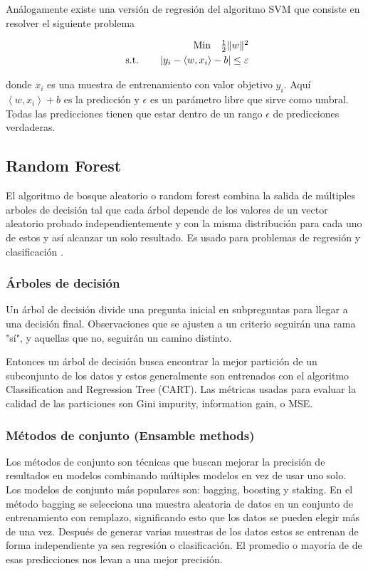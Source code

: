 Análogamente existe una versión de regresión del algoritmo SVM que consiste en resolver el siguiente problema

\[
\begin{array}{r@{}r@{}r@{}l}
	\text{Min} \quad \frac{1}{2}\|w\|^{2} \\[\jot]
	\text{s.t.}\qquad \left|y_{i}-\left\langle w, x_{i}\right\rangle-b\right| \leq \varepsilon \\
	
\end{array}
\]

donde $x_i$ es una muestra de entrenamiento con valor objetivo $y_i$. Aquí $\left\langle w, x_{i}\right\rangle+b$ es la predicción y $\epsilon$ es un parámetro libre que sirve como umbral. Todas las predicciones tienen que estar dentro de un rango $\epsilon$ de predicciones verdaderas. 

\subsection{Random Forest}
El algoritmo de bosque aleatorio o random forest combina la salida de múltiples arboles de decisión tal que cada árbol depende de los valores de un vector aleatorio probado independientemente y con la misma distribución para cada uno de estos y así alcanzar un solo resultado. Es usado para problemas de regresión y clasificación \cite{WhatRandomForest2021}.

\subsubsection{Árboles de decisión}
Un árbol de decisión divide una pregunta inicial en subpreguntas para llegar a una decisión final. Observaciones que se ajusten a un criterio seguirán una rama "sí", y aquellas que no, seguirán un camino distinto.

Entonces un árbol de decisión busca encontrar la mejor partición de un subconjunto de los datos y estos generalmente son entrenados con el algoritmo Classification and Regression Tree (CART).
Las métricas usadas para evaluar la calidad de las particiones son Gini impurity, information gain, o MSE.   

\subsubsection{Métodos de conjunto (Ensamble methods)}

Los métodos de conjunto son técnicas que buscan mejorar la precisión de resultados en modelos combinando múltiples modelos en vez de usar uno solo. Los modelos de conjunto más populares son: bagging, boosting y staking.
En el método bagging se selecciona una muestra aleatoria de datos en un conjunto de entrenamiento con remplazo, significando esto que los datos se pueden elegir más de una vez. Después de generar varias muestras de los datos estos se entrenan de forma independiente ya sea regresión o clasificación. El promedio o mayoría de de esas predicciones nos levan a una mejor precisión.   


